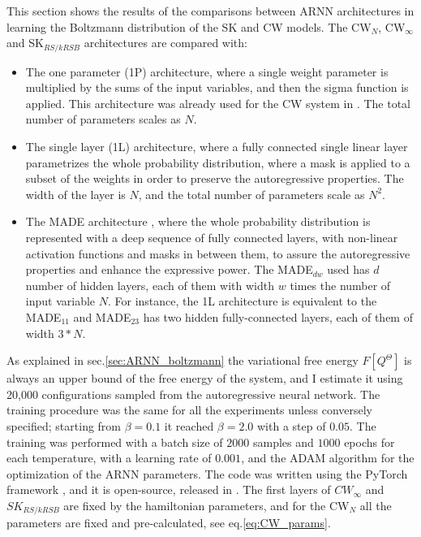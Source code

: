 \documentclass[aps,physrev,10pt,floatfix,reprint]{revtex4-2}
\begin{document}
This section shows the results of the comparisons between ARNN architectures in learning the Boltzmann distribution of the SK and CW models. 
The CW$_N$, CW$_{\infty}$ and SK$_{RS/kRSB}$ architectures are compared with: 
\begin{itemize}
    \item The one parameter (1P) architecture, where a single weight parameter is multiplied by the sums of the input variables, and then the sigma function is applied. This architecture was already used for the CW system in \cite{https://doi.org/10.48550/arxiv.2210.11145}. The total number of parameters scales as $N$.
    \item The single layer (1L) architecture, where a fully connected single linear layer parametrizes the whole probability distribution, where a mask is applied to a subset of the weights in order to preserve the autoregressive properties. The width of the layer is $N$, and the total number of parameters scale as $N^2$.
    \item The MADE architecture \cite{pmlr-v37-germain15}, where the whole probability distribution is represented with a deep sequence of fully connected layers, with non-linear activation functions and masks in between them, to assure the autoregressive properties and enhance the expressive power. The MADE$_{dw}$ used has $d$ number of hidden layers, each of them with width $w$ times the number of input variable $N$. For instance, the 1L architecture is equivalent to the MADE$_{11}$ and MADE$_{23}$ has two hidden fully-connected layers, each of them of width $3*N$. 
\end{itemize}
As explained in sec.\ref{sec:ARNN_boltzmann} the variational free energy $F[Q^{\Theta}]$ is always an upper bound of the free energy of the system, and I estimate it using 20,000 configurations sampled from the autoregressive neural network.
The training procedure was the same for all the experiments unless conversely specified; starting from $\beta=0.1$ it reached $\beta=2.0$ with a step of $0.05$. The training was performed with a batch size of $2000$ samples and $1000$ epochs for each temperature, with a learning rate of $0.001$, and the ADAM algorithm for the optimization of the ARNN parameters. The code was written using the PyTorch framework \cite{NEURIPS2019_bdbca288}, and it is open-source, released in \cite{mygithub}.
The first layers of $CW_{\infty}$ and $SK_{RS/kRSB}$ are fixed by the hamiltonian parameters, and for the CW$_N$ all the parameters are fixed and pre-calculated, see eq.\ref{eq:CW_params}.
\end{document}
